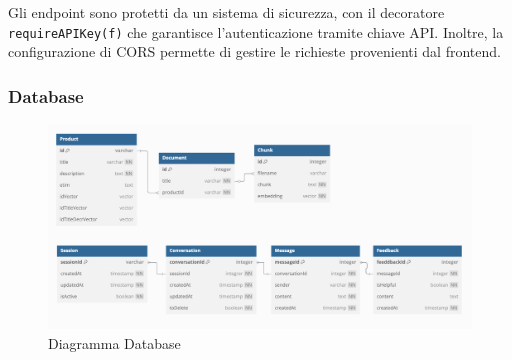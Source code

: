 Gli endpoint sono protetti da un sistema di sicurezza, con il decoratore \texttt{requireAPIKey(f)} che garantisce l’autenticazione tramite chiave API. Inoltre, la configurazione di CORS permette di gestire le richieste provenienti dal frontend.

\subsubsection{Database}
\begin{figure}[H]
    \centering
    \includegraphics[width=\textwidth]{images/DB.png}
    \caption{Diagramma Database}
    \label{fig:Diagramma Database}
\end{figure}

